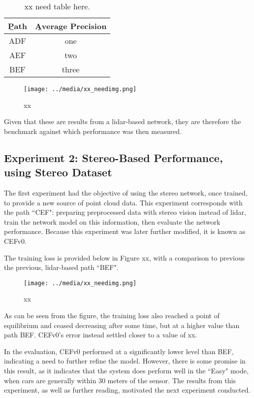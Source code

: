 \begin{table}[ht]
	\centering
	\caption{xx need table here.}
	\begin{tabular}{|c|c|}
		\hline
		\b{Path} & \b{Average Precision} \\ \hline
		  ADF    &    one                \\ \hline
		  AEF    &    two                \\ \hline
		  BEF    &    three              \\ \hline
	\end{tabular}
	\label{test_lidar_ap}
\end{table}


\begin{figure}[H]
	\centering
	\texttt{[image: ../media/xx\_needimg.png]}
	\caption{xx}
	\label{test_lidar_pr}
\end{figure}


Given that these are results from a lidar-based network, they are therefore the benchmark against which performance was then measured. 

\subsection{Experiment 2: Stereo-Based Performance, using Stereo Dataset}
The first experiment had the objective of using the stereo network, once trained, to provide a new source of point cloud data. This experiment corresponds with the path ``CEF": preparing preprocessed data with stereo vision instead of lidar, train the network model on this information, then evaluate the network performance. Because this experiment was later further modified, it is known as CEFv0. 


The training loss is provided below in Figure xx, with a comparison to previous the previous, lidar-based path ``BEF". 

\begin{figure}[H]
	\centering
	\texttt{[image: ../media/xx\_needimg.png]}
	\caption{xx}
	\label{train_stereo1_loss}
\end{figure}

As can be seen from the figure, the training loss also reached a point of equilibrium and ceased decreasing after some time, but at a higher value than path BEF. CEFv0's error instead settled closer to a value of xx. 

In the evaluation, CEFv0 performed at a significantly lower level than BEF, indicating a need to further refine the model. However, there is some promise in this result, as it indicates that the system does perform well in the ``Easy" mode, when cars are generally within 30 meters of the sensor. The results from this experiment, as well as further reading, motivated the next experiment conducted.

